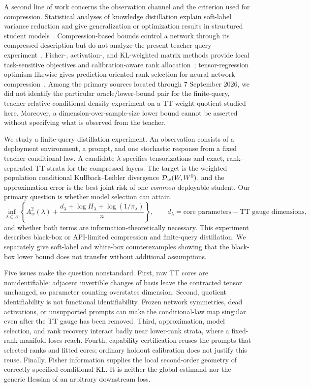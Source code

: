 A second line of work concerns the observation channel and the criterion used for compression. Statistical analyses of knowledge distillation explain soft-label variance reduction and give generalization or optimization results in structured student models~\citep{phuong2019distillation,menon2021distillation,xie2026distillation}. Compression-based bounds control a network through its compressed description but do not analyze the present teacher-query experiment~\citep{arora2018compression,lotfi2024compression}. Fisher-, activation-, and KL-weighted matrix methods provide local task-sensitive objectives and calibration-aware rank allocation~\citep{fisherweighted2022,gfwsvd2025,iosvd2026,laser2026,rafft2026,statlora2026}; tensor-regression optimism likewise gives prediction-oriented rank selection for neural-network compression~\citep{shi2026optimism}. Among the primary sources located through 7 September 2026, we did not identify the particular oracle/lower-bound pair for the finite-query, teacher-relative conditional-density experiment on a TT weight quotient studied here. Moreover, a dimension-over-sample-size lower bound cannot be asserted without specifying what is observed from the teacher.

We study a finite-query distillation experiment. An observation consists of a deployment environment, a prompt, and one stochastic response from a fixed teacher conditional law. A candidate \(\lambda\) specifies tensorizations and exact, rank-separated TT strata for the compressed layers. The target is the weighted population conditional Kullback--Leibler divergence \(\mathcal D_w(W,W^0)\), and the approximation error is the best joint risk of one \emph{common} deployable student. Our primary question is whether model selection can attain
\[
 \inf_{\lambda\in\Lambda}
 \left\{A_w^2(\lambda)+
 \frac{d_\lambda+\log H_\lambda+\log(1/\pi_\lambda)}{n}\right\},
 \qquad
 d_\lambda=\text{core parameters}-\text{TT gauge dimensions},
\]
and whether both terms are information-theoretically necessary. This experiment describes black-box or API-limited compression and finite-query distillation. We separately give soft-label and white-box counterexamples showing that the black-box lower bound does not transfer without additional assumptions.

Five issues make the question nonstandard. First, raw TT cores are nonidentifiable: adjacent invertible changes of basis leave the contracted tensor unchanged, so parameter counting overstates dimension. Second, quotient identifiability is not functional identifiability. Frozen network symmetries, dead activations, or unsupported prompts can make the conditional-law map singular even after the TT gauge has been removed. Third, approximation, model selection, and rank recovery interact badly near lower-rank strata, where a fixed-rank manifold loses reach. Fourth, capability certification reuses the prompts that selected ranks and fitted cores; ordinary holdout calibration does not justify this reuse. Finally, Fisher information supplies the local second-order geometry of correctly specified conditional KL\@. It is neither the global estimand nor the generic Hessian of an arbitrary downstream loss.

